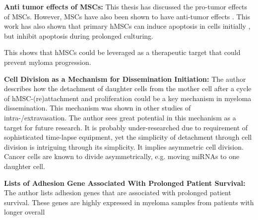 \textbf{Anti tumor effects of MSCs:}
This thesis has discussed the pro-tumor effects of MSCs. However, MSCs have also
been shown to have anti-tumor effects \cite{galderisiMyelomaCellsCan2015}. This
work has also shown that primary \acp{hMSC} can induce apoptosis in  cells
initially ,
but inhibit apoptosis during prolonged culturing.

This shows that hMSCs could be leveraged
as a therapeutic target that could prevent myloma progression.




\textbf{Cell Division as a Mechanism for Dissemination Initiation:}
The author describes how the detachment of daughter cells from the mother cell
after a cycle of hMSC-(re)attachment and proliferation could be a key mechanism
in myeloma dissemination. This mechanism was shown in other studies of
intra-/extravasation. The author sees great potential in this mechanism as a target for
future research. It is probably under-researched due to requirement of
sophisticated time-lapse equipment, yet the simplicity of detachment through
cell division is intriguing through its simplicity. It implies asymmetric cell
division. Cancer cells are known to divide asymmetrically, e.g. moving miRNAs to
one daughter cell.








\textbf{Lists of Adhesion Gene Associated With Prolonged Patient Survival:}
The author lists adhesion genes that are associated with prolonged patient
survival. These genes are highly expressed in myeloma samples from patients with
longer overall

